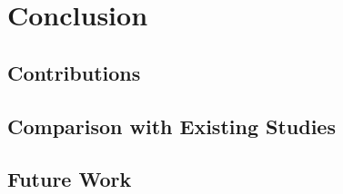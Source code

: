 \graphicspath{{Figures/}}

\chapter{Conclusion} %
\label{cha:conclusion}
\section{Contributions} %
\label{sec:contributions}


\section{Comparison with Existing Studies} %
\label{sec:comparison_with_existing_studies}


\section{Future Work} %
\label{sec:future_work}





 

